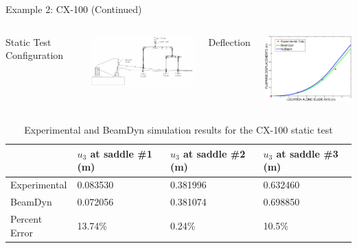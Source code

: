 \documentclass[dvips,xcolor=cmyk]{beamer}
\begin{document}
\begin{frame}{Example 2: CX-100 (Continued)}
\begin{itemize}
\begin{columns}[c]
    \column{2.0 in}
    \item Static Test Configuration
    \begin{center}
     \includegraphics[width=2.4in]{EPSF/CX100Setup.eps}
     \end{center}
     
     \column{2.0 in}
     \item Deflection
     \begin{center}
     \includegraphics[width=2.0in]{EPSF/CX100Disp_New.eps}
     \end{center}
\end{columns}
\end{itemize}
\scriptsize
\begin{table}
\caption{\label{CX100Results}Experimental and BeamDyn simulation results for the CX-100 static test  } 
\begin{center}
    \begin{tabular}{| l | l | l | l |}
    	\hline
    	             & $u_3$ at saddle \#1 (m) & $u_3$ at saddle \#2 (m) & $u_3$ at saddle \#3 (m) \\ \hline
    	Experimental & 0.083530             & 0.381996               & 0.632460             \\ \hline
    	BeamDyn      & 0.072056               & 0.381074                & 0.698850           \\ \hline
    	    	Percent Error      &        13.74\%        & 0.24\%                & 10.5\%           \\ \hline
    \end{tabular}
\end{center}
\end{table} 
\end{frame}
\end{document}

